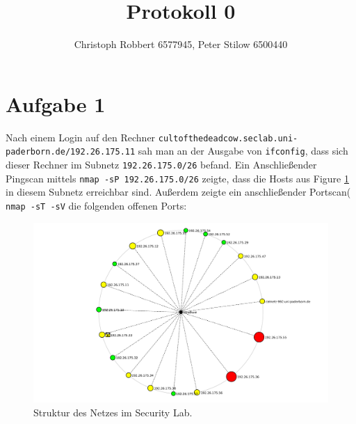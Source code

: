 \documentclass[10pt,a4paper]{article}
\author{Christoph Robbert 6577945, Peter Stilow 6500440}
\title{Protokoll 0}
\begin{document}
\maketitle
 
\section{Aufgabe 1}
Nach einem Login auf den Rechner \texttt{cultofthedeadcow.seclab.uni-paderborn.de/192.26.175.11} sah man an der Ausgabe von \texttt{ifconfig}, dass sich dieser Rechner im Subnetz \texttt{192.26.175.0/26} befand.
Ein Anschließender Pingscan mittels \texttt{nmap -sP 192.26.175.0/26} zeigte, dass die Hosts aus Figure \ref{0_netlayout} in diesem Subnetz erreichbar sind.
Außerdem zeigte ein anschließender Portscan( \texttt{nmap -sT -sV} die folgenden offenen Ports:
\begin{figure}
	\label{0_netlayout}
	\includegraphics[scale=0.4]{figures/0_netlayout.pdf}
	\caption{Struktur des Netzes im Security Lab.}
\end{figure}
\end{document}

